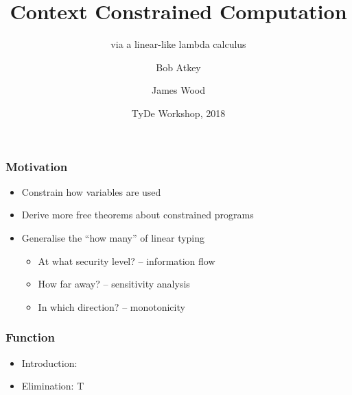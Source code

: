 \documentclass{beamer}
\title{Context Constrained Computation}
\subtitle{via a linear-like lambda calculus}
\author{Bob Atkey\inst{1} \and James Wood\inst{1}}
\institute{\inst{1}University of Strathclyde}
\date{TyDe Workshop, 2018}
\begin{document}
  \frame{\titlepage}
  \begin{frame}
    \frametitle{Motivation}

    \begin{itemize}
    \item Constrain how variables are used
    \item Derive more free theorems about constrained programs
    \item Generalise the ``how many'' of linear typing \pause
      \begin{itemize}
      \item At what security level? -- information flow \pause
      \item How far away? -- sensitivity analysis \pause
      \item In which direction? -- monotonicity
      \end{itemize}
    \end{itemize}
  \end{frame}
  \begin{frame}
    \frametitle{Function}
    \begin{itemize}
      \item Introduction:
                  {\ctx{\Gamma}{\Delta} \vdash {} \ni {}}
      \item Elimination:
                  {\ctx{\Gamma}{\Delta} \vdash {} \in T}
    \end{itemize}
  \end{frame}
\end{document}
